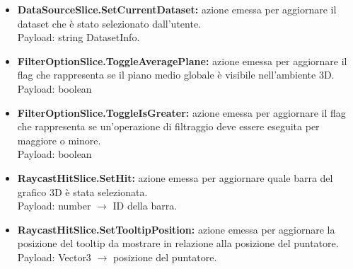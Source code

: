 \begin{itemize}
            \item \textbf{DataSourceSlice.SetCurrentDataset:} azione emessa per aggiornare il dataset che è stato selezionato dall'utente. \\ Payload: string DatasetInfo.
            \item \textbf{FilterOptionSlice.ToggleAveragePlane:} azione emessa per aggiornare il flag che rappresenta se il piano medio globale è visibile nell'ambiente 3D. \\ Payload: boolean 
            \item \textbf{FilterOptionSlice.ToggleIsGreater:} azione emessa per aggiornare il flag che rappresenta se un'operazione di filtraggio deve essere eseguita per maggiore o minore. \\ Payload: boolean
            \item \textbf{RaycastHitSlice.SetHit:} azione emessa per aggiornare quale barra del grafico 3D è stata selezionata. \\ Payload: number $\rightarrow$ ID della barra.
            \item \textbf{RaycastHitSlice.SetTooltipPosition:} azione emessa per aggiornare la posizione del tooltip da mostrare in relazione alla posizione del puntatore.\\ Payload: Vector3 $\rightarrow$ posizione del puntatore.
        \end{itemize}
